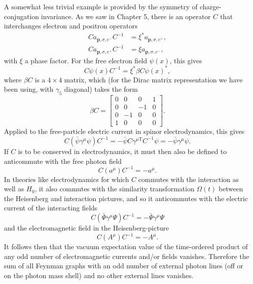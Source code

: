 A somewhat less trivial example is provided by the symmetry of charge-conjugation
invariance. As we saw in Chapter 5, there is an operator $C$
that interchanges electron and positron operators
\begin{align*}
  C a_{\mathbf p,\sigma,e^-}C^{-1}&=\xi^*a_{\mathbf p,\sigma,e^+},\\
  C a_{\mathbf p,\sigma,e^+}C^{-1}&=\xi a_{\mathbf p,\sigma,e^-},
\end{align*}
with $\xi$ a phase factor. For the free electron field $\psi(x)$, this gives
\[
  C\psi(x)C^{-1}=\xi^*\beta C\psi(x)^*,
\]
where $\beta C$ is a $4\times4$ matrix, which (for the Dirac matrix representation
we have been using, with $\gamma_5$ diagonal) takes the form
\[
  \beta C=
  \begin{bmatrix}
    0&0&0&1\\
    0&0&-1&0\\
    0&-1&0&0\\
    1&0&0&0
  \end{bmatrix}.
\]
Applied to the free-particle electric current in spinor electrodynamics, this
gives
\[
  C(\bar\psi\gamma^\mu\psi)C^{-1}
  =-\bar\psi C\gamma^{\mu\mathrm T}C^{-1}\psi
  =-\bar\psi\gamma^\mu\psi.
\]
If $C$ is to be conserved in electrodynamics, it must then also be defined to
anticommute with the free photon field
\[
  C(a^\mu)C^{-1}=-a^\mu.
\]
In theories like electrodynamics for which $C$ commutes with the interaction
as well as $H_0$, it also commutes with the similarity transformation $\Omega(t)$
between the Heisenberg and interaction pictures, and so it anticommutes
with the electric current of the interacting fields
\begin{equation}
  C(\bar\Psi\gamma^\mu\Psi)C^{-1}=-\bar\Psi\gamma^\mu\Psi
  \tag{10.1.8}\label{eq:10.1.8}
\end{equation}
and the electromagnetic field in the Heisenberg-picture
\begin{equation}
  C(A^\mu)C^{-1}=-A^\mu.
  \tag{10.1.9}\label{eq:10.1.9}
\end{equation}
It follows then that the vacuum expectation value of the time-ordered
product of any odd number of electromagnetic currents and/or fields
vanishes. Therefore the sum of all Feynman graphs with an odd number
of external photon lines (off or on the photon mass shell) and no other
external lines vanishes.

